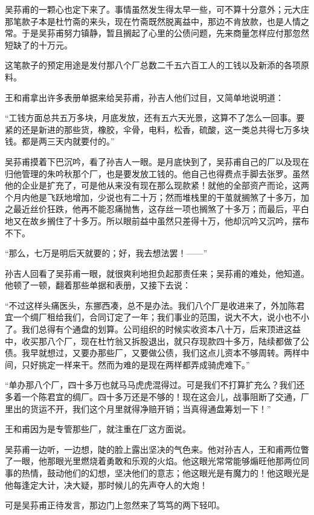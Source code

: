 \par 吴荪甫的一颗心也定下来了。事情虽然发生得太早一些，可不算十分意外；元大庄那笔款子本是杜竹斋的来头，现在竹斋既然脱离益中，那边不肯放款，也是人情之常。于是吴荪甫努力镇静，暂且搁起了心里的公债问题，先来商量怎样应付那忽然短缺了的十万元。
\par 这笔款子的预定用途是发付那八个厂总数二千五六百工人的工钱以及新添的各项原料。
\par 王和甫拿出许多表册单据来给吴荪甫，孙吉人他们过目，又简单地说明道：
\par “工钱方面总共五万多块，月底发放，还有五六天光景，这算不了怎么一回事。要紧的还是新进的那些货，橡胶，伞骨，电料，松香，硫酸，这一类总共得七万多块钱。都是两三天内就要付的。”
\par 吴荪甫摸着下巴沉吟，看了孙吉人一眼。是月底快到了，吴荪甫自己的厂以及现在归他管理的朱吟秋那个厂，也是要发放工钱的。他自己也得费点手脚去张罗。虽然他的企业是扩充了，可是他从来没有现在那么现款紧！就他的全部资产而论，这两个月内他是飞跃地增加，少说也有二十万；然而堆栈里的干茧就搁煞了十多万，加之最近丝价狂跌，他再不能忍痛抛售，这存丝一项也搁煞了十多万；而最后，平白地又在故乡搁住了十多万。所以眼前益中虽然只差得十万，他却沉吟又沉吟，摆布不下。
\par “那么，七万是明后天就要的；好，我去想法罢！——”
\par 孙吉人回看了吴荪甫一眼，就很爽利地担负起那责任来；吴荪甫的难处，他知道。他顿了一顿，翻着那些单据和表册，又接下去说：
\par “不过这样头痛医头，东挪西凑，总不是办法。我们八个厂是收进来了，外加陈君宜一个绸厂租给我们，合同订定了一年；我们事业的范围，说大不大，说小也不小了。我们总得有个通盘的划算。公司组织的时候实收资本八十万，后来顶进这益中，收买那八个厂，现在杜竹翁又拆股退出，就只存现款四十多万，陆续都做了公债。我早就想过，又要办那些厂，又要做公债，我们这点儿资本不够周转。两样中间，只好挑定一样来干。然而为难的是现在两样都弄成骑虎难下。”
\par “单办那八个厂，四十多万也就马马虎虎混得过。可是我们不打算扩充么？我们还多着一个陈君宜的绸厂。四十多万还是不够的！现在这会儿，战事阻断了交通，厂里出的货运不开，我们这个月里就得净赔开销；当真得通盘筹划一下！”
\par 王和甫因为是专管那些厂，就注重在厂这方面说。
\par 吴荪甫一边听，一边想，陡的脸上露出坚决的气色来。他对孙吉人，王和甫两位瞥了一眼，他那眼光里燃烧着勇敢和乐观的火焰。他这眼光常常能够煽旺他那两位同事的热情，鼓动他们的幻想，坚决他们的意志；他这眼光是有魔力的！他这眼光是他每逢定大计，决大疑，那时候儿的先声夺人的大炮！
\par 可是吴荪甫正待发言，那边门上忽然来了笃笃的两下轻叩。
